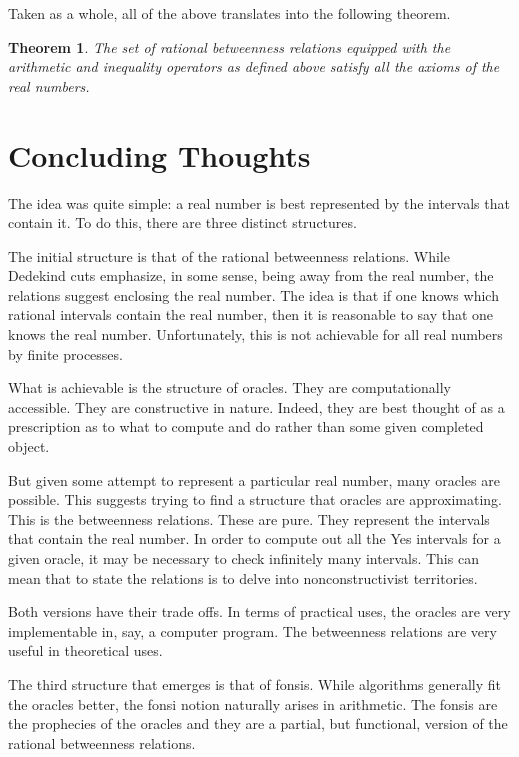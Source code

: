 \documentclass[12pt]{article}
\newtheorem{theorem}{Theorem}[section]
\begin{document}
Taken as a whole, all of the above translates into the following theorem.

\begin{theorem}
    The set of rational betweenness relations equipped with the arithmetic and inequality operators as defined above satisfy all the axioms of the real numbers. 
\end{theorem}


\section{Concluding Thoughts}

The idea was quite simple:  a real number is best represented by the intervals that contain it. To do this, there are three distinct structures. 

The initial structure is that of the rational betweenness relations. While Dedekind cuts emphasize, in some sense, being away from the real number, the relations suggest enclosing the real number. The idea is that if one knows which rational intervals contain the real number, then it is reasonable to say that one knows the real number. Unfortunately, this is not achievable for all real numbers by finite processes. 

What is achievable is the structure of oracles. They are computationally accessible. They are constructive in nature. Indeed, they are best thought of as a prescription as to what to compute and do rather than some given completed object. 

But given some attempt to represent a particular real number, many oracles are possible. This suggests trying to find a structure that oracles are approximating. This is the betweenness relations. These are pure. They represent the intervals that contain the real number. In order to compute out all the Yes intervals for a given oracle, it may be necessary to check infinitely many intervals. This can mean that to state the relations is to delve into nonconstructivist territories. 

Both versions have their trade offs. In terms of practical uses, the oracles are very implementable in, say, a computer program. The betweenness relations are very useful in theoretical uses. 

The third structure that emerges is that of fonsis. While algorithms generally fit the oracles better, the fonsi notion naturally arises in arithmetic. The fonsis are the prophecies of the oracles and they are a partial, but functional, version of the rational betweenness relations. 
\end{document}

